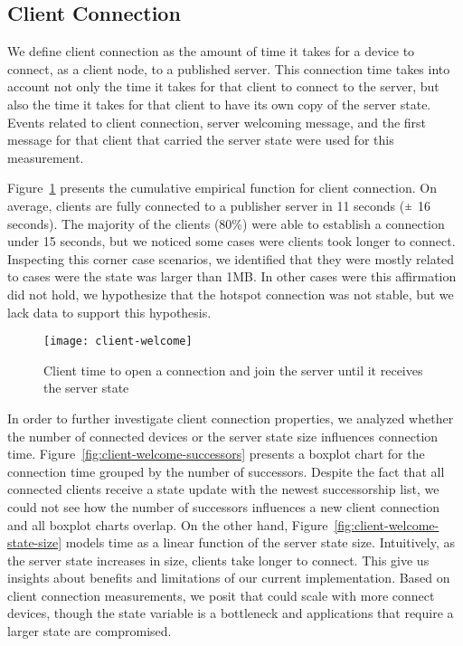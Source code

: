 \subsection{Client Connection}
\label{sub:eval:connection}


We define client connection as the amount of time it takes for a device to connect, as a client node, to a published server.
This connection time takes into account not only the time it takes for that client to connect to the server, 
but also the time it takes for that client to have its own copy of the server state. 
Events related to client connection, server welcoming message, and the first message for that client that carried the server state were used for this measurement.


Figure~\ref{fig:client-welcome} presents the cumulative empirical function for client connection.
On average, clients are fully connected to a publisher server in 11 seconds ($\rpm$ 16 seconds). 
The majority of the clients (80\%) were able to establish a connection under 15 seconds, 
but we noticed some cases were clients took longer to connect. 
Inspecting this corner case scenarios, we identified that they were mostly related to cases were the state was larger than 1MB.
In other cases were this affirmation did not hold, we hypothesize that the hotspot connection was not stable, but we lack data to support this hypothesis.


\begin{figure}
    \centering
    \texttt{[image: client-welcome]}
    \caption{Client time to open a connection and join the server until it receives the server state}
    \label{fig:client-welcome}
\end{figure}


In order to further investigate client connection properties, we analyzed whether the number of connected devices or the server state size influences connection time.
Figure~\ref{fig:client-welcome-successors} presents a boxplot chart for the connection time grouped by the number of successors.
Despite the fact that all connected clients receive a state update with the newest successorship list, 
we could not see how the number of successors influences a new client connection and all boxplot charts overlap.
On the other hand, Figure~\ref{fig:client-welcome-state-size} models time as a linear function of the server state size.
Intuitively, as the server state increases in size, clients take longer to connect. 
This give us insights about benefits and limitations of our current implementation.
Based on client connection measurements, we posit that \APIshort could scale with more connect devices, though the state variable is a bottleneck and applications that require a larger state are compromised.


